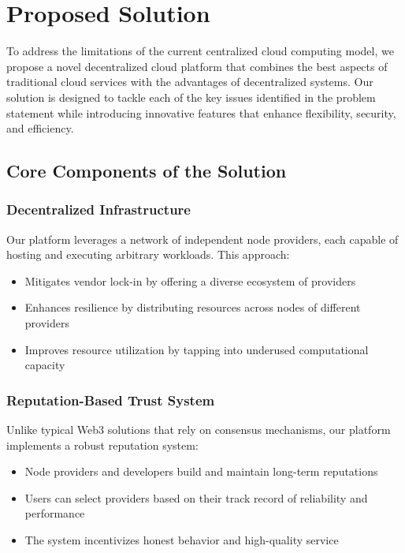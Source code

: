 \section{Proposed Solution}
\label{sec:proposed_solution}

To address the limitations of the current centralized cloud computing model, we propose a novel decentralized cloud platform that combines the best aspects of traditional cloud services with the advantages of decentralized systems. Our solution is designed to tackle each of the key issues identified in the problem statement while introducing innovative features that enhance flexibility, security, and efficiency.

\subsection{Core Components of the Solution}

\subsubsection{Decentralized Infrastructure}
Our platform leverages a network of independent node providers, each capable of hosting and executing arbitrary workloads. This approach:
\begin{itemize}
    \item Mitigates vendor lock-in by offering a diverse ecosystem of providers
    \item Enhances resilience by distributing resources across nodes of different providers
    \item Improves resource utilization by tapping into underused computational capacity
\end{itemize}

\subsubsection{Reputation-Based Trust System}
\label{subsec:reputation_system}
Unlike typical Web3 solutions that rely on consensus mechanisms, our platform implements a robust reputation system:
\begin{itemize}
    \item Node providers and developers build and maintain long-term reputations
    \item Users can select providers based on their track record of reliability and performance
    \item The system incentivizes honest behavior and high-quality service
\end{itemize}

